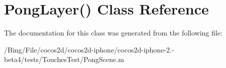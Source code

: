 \hypertarget{interface_pong_layer_07_08}{\section{Pong\-Layer() Class Reference}
\label{interface_pong_layer_07_08}
}


The documentation for this class was generated from the following file\-:\begin{DoxyCompactItemize}
\item 
/\-Bing/\-File/cocos2d/cocos2d-\/iphone/cocos2d-\/iphone-\/2.-\/beta4/tests/\-Touches\-Test/Pong\-Scene.\-m\end{DoxyCompactItemize}
